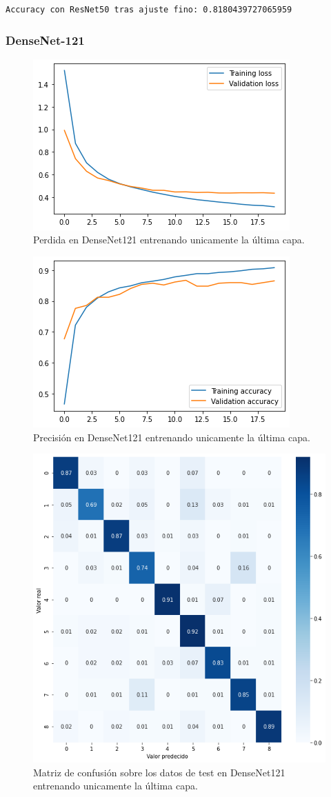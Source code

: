\begin{lstlisting}
Accuracy con ResNet50 tras ajuste fino: 0.8180439727065959
\end{lstlisting}



\subsubsection{DenseNet-121}


\begin{figure}[H]
  \centering
  \includegraphics[width=0.5\linewidth]{Imagenes/entrenamiento_redes/ult/densenet_ult_loss.png}
  \caption{Perdida en DenseNet121 entrenando unicamente la última capa.}
\end{figure}

\begin{figure}[H]
  \centering
  \includegraphics[width=0.5\linewidth]{Imagenes/entrenamiento_redes/ult/densenet_ult_acc.png}
  \caption{Precisión en DenseNet121 entrenando unicamente la última capa.}
\end{figure}

\begin{figure}[H]
  \centering
  \includegraphics[width=0.5\linewidth]{Imagenes/entrenamiento_redes/ult/densenet_ult_matriz.png}
  \caption{Matriz de confusión sobre los datos de test en DenseNet121 entrenando unicamente la última capa.}
\end{figure}

